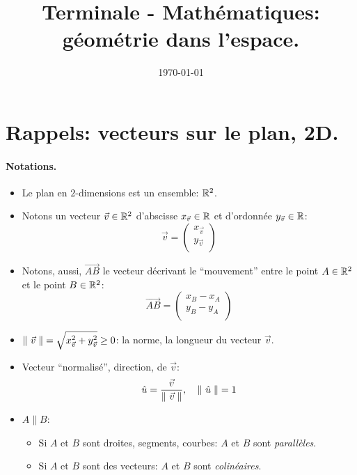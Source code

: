 \documentclass[12pt]{article}
\title{Terminale - Mathématiques: géométrie dans l'espace.}
\author{\AuthorName}
\date{\today{}}
\begin{document}
\maketitle

\section{Rappels: vecteurs sur le plan, 2D.}

\paragraph{Notations.}
\begin{itemize}
    \item Le plan en $2$-dimensions est un ensemble: $\mathbb{R}^2$.

    \item Notons un vecteur $\vec{v} \in \mathbb{R}^2$ 
    d'abscisse $x_{\vec{v}} \in \mathbb{R}$ et d'ordonnée $y_{\vec{v}} \in \mathbb{R}$: $$
        \vec{v} = \begin{pmatrix}
            x_{\vec{v}} \\
            y_{\vec{v}} \\
        \end{pmatrix}
    $$


    \item Notons, aussi, $\overrightarrow{AB}$ le vecteur décrivant le
    \enquote{mouvement} entre le point $A \in \mathbb{R}^2$ et le point $B \in \mathbb{R}^2$: $$
        \overrightarrow{AB} = \begin{pmatrix}
            x_B - x_A \\
            y_B - y_A \\
        \end{pmatrix}
    $$

    \item $
        \left\lVert\ \vec{v}\;\right\rVert   
        = \sqrt{x_{\vec{v}}^2 + y_{\vec{v}}^2}
        \geq 0
    $: la norme, la longueur du vecteur $\vec{v}$.

    \item Vecteur \enquote{normalisé}, direction, de $\vec{v}$: $$
        \hat{u} = \frac{\vec{v}}{\left\lVert\ \vec{v}\;\right\rVert},
        \quad \left\lVert\ \hat{u}\;\right\rVert = 1
    $$ 

    \item $A \parallel B$: 
    \begin{itemize}
        \item Si $A$ et $B$ sont droites, segments, courbes:
            $A$ et $B$ sont \textit{parallèles}.
        \item Si $A$ et $B$ sont des vecteurs:
            $A$ et $B$ sont \textit{colinéaires}. 
    \end{itemize}
        

\end{itemize}
\end{document}

